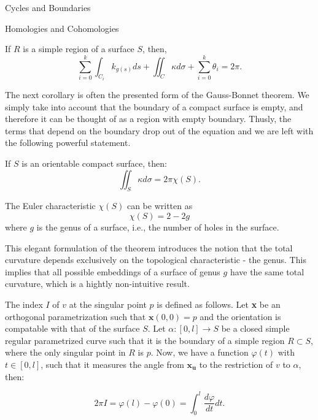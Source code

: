 \begin{subsubsection}{Cycles and Boundaries}
\begin{subsubsection}{Homologies and Cohomologies}
  \begin{corollary} If $R$ is a simple region of a surface $S$, then,
    \begin{equation}
      \sum_{i=0}^k \int_{C_i} k_{g(s)}ds + \iint_C\kappa d\sigma
      +\sum_{i=0}^k\theta_i = 2\pi.
    \end{equation}
    \end{corollary}
  The next corollary is often the presented form of the Gauss-Bonnet theorem.
  We simply take into account that the boundary of a compact surface is empty,
  and therefore it can be thought of as a region with empty boundary. Thusly,
  the terms that depend on the boundary drop out of the equation and we are
  left with the following powerful statement.
  \begin{corollary}
    If $S$ is an orientable compact surface, then:
    \begin{equation}
      \iint_S\kappa d\sigma = 2\pi\chi(S).
    \end{equation}
  \end{corollary}
  \begin{remark}
    The Euler characteristic $\chi(S)$ can be written as
    \begin{equation}
      \chi(S) = 2-2g
    \end{equation}
    where $g$ is the genus of a surface, i.e., the number of holes in the
    surface.
  \end{remark}
  \begin{remark}
    This elegant formulation of the theorem introduces the notion that the
    total curvature depends exclusively on the topological characteristic - the
    genus. This implies that all possible embeddings of a surface of genus $g$ 
    have the same total curvature, which is a hightly non-intuitive result.
  \end{remark}
  \begin{definition}The index $I$ of $v$ at the
  singular point $p$ is defined as follows. Let \textbf{x} be an orthogonal
  parametrization such that $\textbf{x}(0,0)=p$ and the orientation is
  compatable with that of the surface $S$. Let $\alpha:[0,l]\rightarrow S$ be
  a closed simple regular parametrized curve such that it is the boundary
  of a simple region $R\subset S$, where the only singular point in $R$ is $p$.
  Now, we have a function $\varphi(t)$ with $t\in[0,l]$, such that it 
  measures the angle from $\textbf{x}_{\textbf{u}}$ to the restriction of $v$ to $\alpha$,
then:
\end{definition}
  \begin{equation}
     2\pi I = \varphi(l)-\varphi(0) = \int_{0}^{l}\frac{d\varphi}{dt}dt.
   \end{equation}


\end{subsubsection}
\end{subsubsection}
